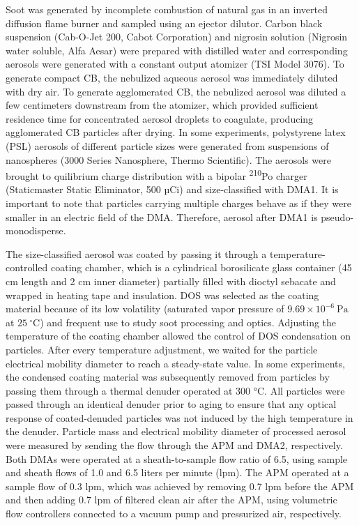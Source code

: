 Soot was generated by incomplete combustion of natural gas in an inverted diffusion flame burner \citep{RN43,RN44} and sampled using an ejector dilutor. Carbon black suspension (Cab-O-Jet 200, Cabot Corporation) and nigrosin solution (Nigrosin water soluble, Alfa Aesar) were prepared with distilled water and corresponding aerosols were generated with a constant output atomizer (TSI Model 3076). To generate compact CB, the nebulized aqueous aerosol was immediately diluted with dry air. To generate agglomerated CB, the nebulized aerosol was diluted a few centimeters downstream from the atomizer, which provided sufficient residence time for concentrated aerosol droplets to coagulate, producing agglomerated CB particles after drying. In some experiments, polystyrene latex (PSL) aerosols of different particle sizes were generated from suspensions of nanospheres (3000 Series Nanosphere, Thermo Scientific). The aerosols were brought to quilibrium charge distribution with a bipolar \textsuperscript{210}Po charger (Staticmaster Static Eliminator, 500 µCi) and size-classified with DMA1. It is important to note that particles carrying multiple charges behave as if they were smaller in an electric field of the DMA. Therefore, aerosol after DMA1 is pseudo-monodisperse.

The size-classified aerosol was coated by passing it through a temperature-controlled coating chamber, which is a cylindrical borosilicate glass container (45 cm length and 2 cm inner diameter) partially filled with dioctyl sebacate and wrapped in heating tape and insulation. DOS was selected as the coating material because of its low volatility (saturated vapor pressure of $9.69\times10^{-6}\ \mathrm{Pa}$ at $25\ \mathrm{^{\circ}C}$) and frequent use to study soot processing and optics.
Adjusting the temperature of the coating chamber allowed the control of DOS condensation on particles. After every temperature adjustment, we waited for the particle electrical mobility diameter to reach a steady-state value. In some experiments, the condensed coating material was subsequently removed from particles by passing them through a thermal denuder operated at 300 °C. All particles were passed through an identical denuder prior to aging to ensure that any optical response of coated-denuded particles was not induced by the high temperature in the denuder. Particle mass and electrical mobility diameter of processed aerosol were measured by sending the flow through the APM and DMA2, respectively. Both DMAs were operated at a sheath-to-sample flow ratio of 6.5, using sample and sheath flows of 1.0 and 6.5 liters per minute (lpm). The APM operated at a sample flow of 0.3 lpm, which was achieved by removing 0.7 lpm before the APM and then adding 0.7 lpm of filtered clean air after the APM, using volumetric flow controllers connected to a vacuum pump and pressurized air, respectively.

